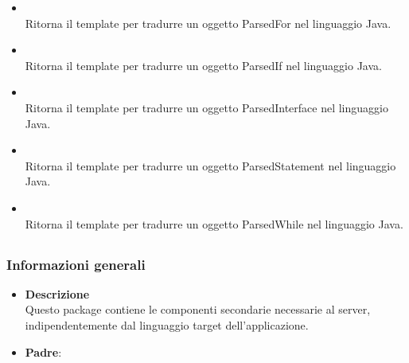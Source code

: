 \begin{itemize}
\begin{itemize}
\item {}
\\ Ritorna il template per tradurre un oggetto ParsedFor nel linguaggio Java.
\item {}
\\ Ritorna il template per tradurre un oggetto ParsedIf nel linguaggio Java.
\item {}
\\ Ritorna il template per tradurre un oggetto ParsedInterface nel linguaggio Java.
\item {}
\\ Ritorna il template per tradurre un oggetto ParsedStatement nel linguaggio Java.
\item {}
\\ Ritorna il template per tradurre un oggetto ParsedWhile nel linguaggio Java.
\end{itemize}
\end{itemize}
\subsection{}
\label{\nogloxy{swedesigner::server::utility}}
\subsubsection{Informazioni generali}
\begin{itemize}
\item \textbf{Descrizione}\\
Questo package contiene le componenti secondarie necessarie al server, indipendentemente dal linguaggio target dell'applicazione.
\item \textbf{Padre}: \hyperref[\nogloxy{swedesigner::server}]{}
\end{itemize}

